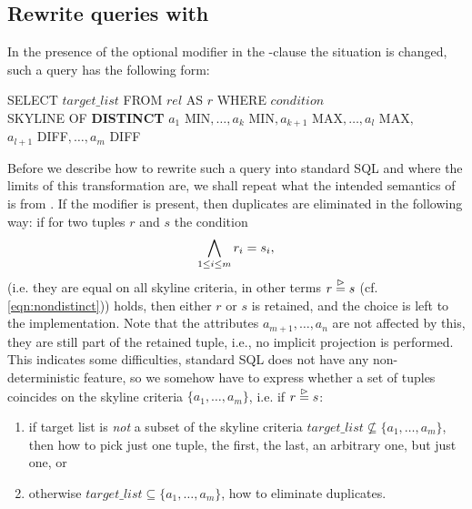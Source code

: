 \subsection{Rewrite queries with }
\label{sec:rewrite-queries-with-distinct}
In the presence of the optional  modifier in the
-clause the situation is changed, such a query has the
following form:
%
\begin{sql}\label{sql:rewrite-distinct}
SELECT $target\_list$ FROM $rel$ AS $r$ WHERE $condition$ \\
SKYLINE OF \textbf{DISTINCT} $a_1$ MIN$, \ldots, a_k$ MIN$, a_{k+1}$ MAX$, \ldots, a_l$ MAX$,$  \\
$a_{l+1}$ DIFF$, \ldots, a_m$ DIFF
\end{sql}
%
Before we describe how to rewrite such a query into standard SQL and
where the limits of this transformation are, we shall repeat what the
intended semantics of  is from
\citep{Borzsonyi2001}.  If the  modifier is
present, then duplicates are eliminated in the following way: if for
two tuples $r$ and $s$ the condition
\[
\bigwedge_{1 \le i \le m} r_i = s_i,
\]
(i.e. they are equal on all skyline criteria, in other terms $r
\stackrel{\vartriangleright}{=} s$ (cf. \eqref{eqn:nondistinct})) holds, then either $r$
or $s$ is retained, and the choice is left to the implementation. Note
that the attributes $a_{m+1}, \ldots, a_n$ are not affected by this,
they are still part of the retained tuple, i.e., no implicit projection
is performed. This indicates some difficulties, standard SQL does not
have any non-deterministic feature, so we somehow have to express whether
a set of tuples coincides on the skyline criteria $\{a_1, \ldots,
a_m\}$, i.e. if $r \stackrel{\vartriangleright}{=} s$:

\begin{enumerate}
\item
if target list is \emph{not} a subset of the skyline criteria $target\_list
\not\subseteq \{a_1, \ldots, a_m\}$, then how to pick just one tuple,
the first, the last, an arbitrary one, but just one, or

\item
otherwise $target\_list \subseteq \{a_1, \ldots, a_m\}$, how to
eliminate duplicates.
\end{enumerate}

